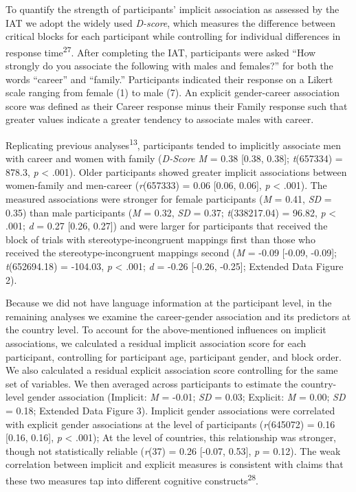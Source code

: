 \documentclass[11pt]{wlscirep}
\begin{document}
To quantify the strength of participants’ implicit association as assessed by the IAT we adopt the widely used  \emph{D-score}, which measures the difference between critical blocks for each participant while controlling for individual differences
in response time\textsuperscript{27}. After completing
the IAT, participants were asked \enquote{How strongly do you associate
the following with males and females?} for both the words
\enquote{career} and \enquote{family.} Participants indicated their
response on a Likert scale ranging from female (1) to male
(7). An explicit gender-career association score was defined as their Career response minus their Family response such that greater values indicate a greater tendency to associate males with career.

Replicating previous analyses\textsuperscript{13}, participants tended to implicitly associate men with career and women with family (\emph{D-Score M} = 0.38 {[}0.38, 0.38{]}; \emph{t}(657334) = 878.3, \emph{p} \textless{} .001). Older participants showed greater implicit associations between women-family and men-career  (\emph{r}(657333) = 0.06 {[}0.06, 0.06{]}, \emph{p} \textless{} .001).  The measured associations were stronger for female participants (\emph{M} = 0.41, \emph{SD} = 0.35) than male participants
(\emph{M} = 0.32, \emph{SD} = 0.37; \emph{t}(338217.04) = 96.82, \emph{p} \textless{} .001; \emph{d} = 0.27 {[}0.26, 0.27{]}) and were larger for participants that received the block of trials with stereotype-incongruent mappings first than those who received the stereotype-incongruent mappings second (\emph{M} = -0.09 {[}-0.09, -0.09{]}; \emph{t}(652694.18) = -104.03, \emph{p} \textless{} .001; \emph{d} = -0.26 {[}-0.26, -0.25{]}; Extended Data Figure 2). 


Because we did not have language information at the participant level, in the remaining analyses we examine the career-gender association and its predictors at the country level. To account for the above-mentioned influences on implicit associations, we calculated a residual implicit association score for each participant, controlling for participant age, participant gender, and block order. We also calculated a residual explicit association score controlling for the same set of variables. We then averaged across participants to estimate the country-level gender association (Implicit: \emph{M} = -0.01; \emph{SD} = 0.03; Explicit: \emph{M} = 0.00; \emph{SD} = 0.18; Extended Data Figure 3). Implicit gender associations were correlated with explicit gender associations at the level of participants (\emph{r}(645072) = 0.16 {[}0.16, 0.16{]}, \emph{p} \textless{} .001); At the level of countries, this relationship was stronger, though not statistically reliable (\emph{r}(37) = 0.26 {[}-0.07, 0.53{]}, \emph{p} = 0.12). The weak correlation between implicit and explicit measures is consistent with claims that these two measures tap into different cognitive constructs\textsuperscript{28}.
\end{document}
